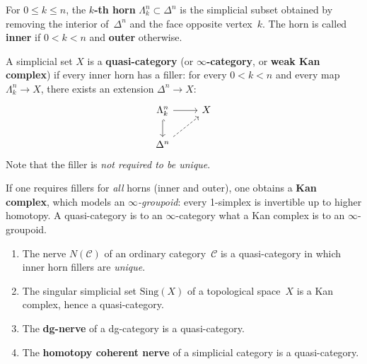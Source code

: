 \begin{definition}[Horn]\label{def:horn}
For $0\le k\le n$, the \textbf{$k$-th horn} $\Lambda^n_k\subset\Delta^n$
is the simplicial subset obtained by removing the interior of~$\Delta^n$
and the face opposite vertex~$k$.  The horn is called \textbf{inner} if
$0 < k < n$ and \textbf{outer} otherwise.
\end{definition}

\begin{definition}\label{def:quasi-category}
A simplicial set $X$ is a \textbf{quasi-category} (or \textbf{$\infty$-category},
or \textbf{weak Kan complex}) if every inner horn has a filler:
for every $0 < k < n$ and every map $\Lambda^n_k\to X$, there exists
an extension $\Delta^n\to X$:
\[
\begin{tikzcd}
\Lambda^n_k \arrow[r] \arrow[d, hook] & X \\
\Delta^n \arrow[ur, dashed] &
\end{tikzcd}
\]
Note that the filler is \emph{not required to be unique}.
\end{definition}

\begin{remark}\label{rem:kan-vs-quasi}
If one requires fillers for \emph{all} horns (inner and outer), one
obtains a \textbf{Kan complex}, which models an \emph{$\infty$-groupoid}:
every 1-simplex is invertible up to higher homotopy.  A quasi-category
is to an $\infty$-category what a Kan complex is to an $\infty$-groupoid.
\end{remark}

\begin{example}\label{ex:quasi-cat-examples}
\begin{enumerate}[label=(\roman*)]
\item The nerve $N(\mathcal{C})$ of an ordinary category~$\mathcal{C}$ is
      a quasi-category in which inner horn fillers are \emph{unique}.
\item The singular simplicial set $\mathrm{Sing}(X)$ of a topological
      space~$X$ is a Kan complex, hence a quasi-category.
\item The \textbf{dg-nerve} of a dg-category is a quasi-category.
\item The \textbf{homotopy coherent nerve} of a simplicial category is a
      quasi-category.
\end{enumerate}
\end{example}

